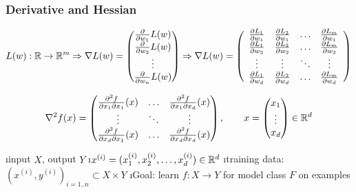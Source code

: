 \subsubsection{Derivative and Hessian}

\newcommand{\dlw}[2]{\frac{\partial L_#1}{\partial w_#2}}
\begin{align*}
L(w): \RS \to \RS^m
\Rightarrow  \nabla L(w) = \vct{\drv{w_1}L(w)\\\drv{w_2}L(w)\\\vdots\\\drv{w_n}L(w)}
\Rightarrow \nabla L(w) = \left(\begin{array}{cccc}
\dlw{1}{1} & \dlw{2}{1} & \ldots & \dlw{m}{1} \\
\dlw{1}{2} & \dlw{2}{2} & \ldots & \dlw{m}{2} \\
\vdots & \vdots & \ddots & \vdots \\
\dlw{1}{d} & \dlw{2}{d} & \ldots & \dlw{m}{d}
\end{array}\right)
\end{align*}

\newcommand{\dfdx}[2]{
    \frac{\partial^2 f}{\partial x_{#1} \partial x_{#2}} (x)
}
\begin{align*}
\nabla^2 f(x) =
\vct{
    \dfdx{1}{1} & \ldots & \dfdx{1}{d} \\
    \vdots & \ddots & \vdots \\
    \dfdx{d}{1} & \ldots & \dfdx{d}{d} 
}, \qquad x = \vct{x_1\\\vdots\\x_d} \in \RS^d
\end{align*}




\bi
\i input $X$, output $Y$
\i $x^{(i)} = (x^{(i)}_1, x^{(i)}_2, \ldots, x^{(i)}_d) \in \mathbb{R}^d$ 
\i training data: $(x^{(i)}, y^{(i)})_{i=1..n} \subset X \times Y$
\i Goal: learn $f: X \to Y$ for model class $F$ on examples
\ei

